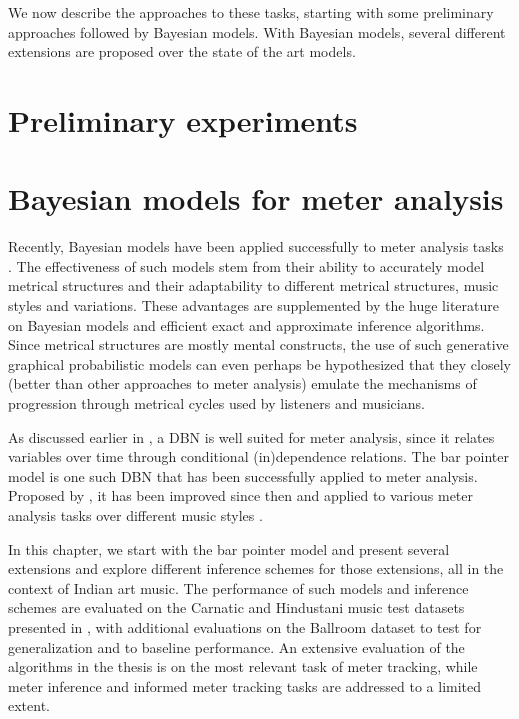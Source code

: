 We now describe the approaches to these tasks, starting with some preliminary approaches followed by Bayesian models. With Bayesian models, several different extensions are proposed over the state of the art models. 
%
\section{Preliminary experiments}\label{sec:mt:earlyexpts}

%
\section{Bayesian models for meter analysis}\label{sec:mt:bayesmodels}
Recently, Bayesian models have been applied successfully to meter analysis tasks \cite{krebs:13:bpm,bock:14:multimodel,krebs:15:pf}. The effectiveness of such models stem from their ability to accurately model metrical structures and their adaptability to different metrical structures, music styles and variations. These advantages are supplemented by the huge literature on Bayesian models and efficient exact and approximate inference algorithms. Since metrical structures are mostly mental constructs, the use of such generative graphical probabilistic models can even perhaps be hypothesized that they closely (better than other approaches to meter analysis) emulate the mechanisms of progression through metrical cycles used by listeners and musicians. 

As discussed earlier in , a \acrfull{DBN} \cite{murphy:02:thesis} is well suited for meter analysis, since it relates variables over time through conditional (in)dependence relations. The bar pointer model is one such \gls{DBN} that has been successfully applied to meter analysis. Proposed by , it has been improved since then and applied to various meter analysis tasks over different music styles \cite{whiteley:07:seqInf,krebs:13:bpm,krebs:15:pf,bock:14:multimodel,holzapfel:14:odd,krebs:15:ismir,ajay:15:pf,ajay:16:spmodel}. 

In this chapter, we start with the bar pointer model and present several extensions and explore different inference schemes for those extensions, all in the context of Indian art music. The performance of such models and inference schemes are evaluated on the Carnatic and Hindustani music test datasets presented in , with additional evaluations on the Ballroom dataset to test for generalization and to baseline performance. An extensive evaluation of the algorithms in the thesis is on the most relevant task of meter tracking, while meter inference and informed meter tracking tasks are addressed to a limited extent. 


